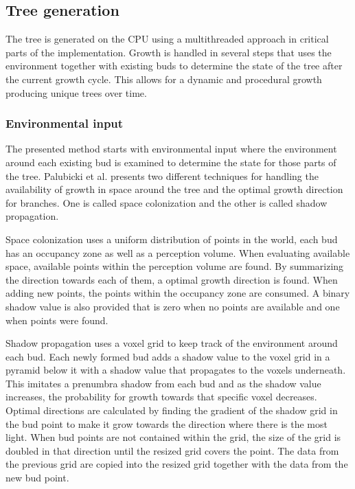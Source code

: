 \documentclass[11pt]{article} %
\begin{document}
\subsection{Tree generation}
The tree is generated on the CPU using a multithreaded approach in critical parts of the implementation.
Growth is handled in several steps that uses the environment together with existing buds to determine the state of the tree after the current growth cycle.
This allows for a dynamic and procedural growth producing unique trees over time.

\subsubsection{Environmental input}
The presented method starts with environmental input where the environment around each existing bud is examined to determine the state for those parts of the tree.
Palubicki et al.\cite{Palubicki:2009:STM:1531326.1531364} presents two different techniques for handling the availability of growth in space around the tree and the optimal growth direction for branches.
One is called space colonization and the other is called shadow propagation.

Space colonization uses a uniform distribution of points in the world, each bud has an occupancy zone as well as a perception volume.
When evaluating available space, available points within the perception volume are found.
By summarizing the direction towards each of them, a optimal growth direction is found.
When adding new points, the points within the occupancy zone are consumed.
A binary shadow value is also provided that is zero when no points are available and one when points were found.

Shadow propagation uses a voxel grid to keep track of the environment around each bud.
Each newly formed bud adds a shadow value to the voxel grid in a pyramid below it with a shadow value that propagates to the voxels underneath.
This imitates a prenumbra shadow from each bud and as the shadow value increases, the probability for growth towards that specific voxel decreases.
Optimal directions are calculated by finding the gradient of the shadow grid in the bud point to make it grow towards the direction where there is the most light.
When bud points are not contained within the grid, the size of the grid is doubled in that direction until the resized grid covers the point.
The data from the previous grid are copied into the resized grid together with the data from the new bud point.
\end{document}
